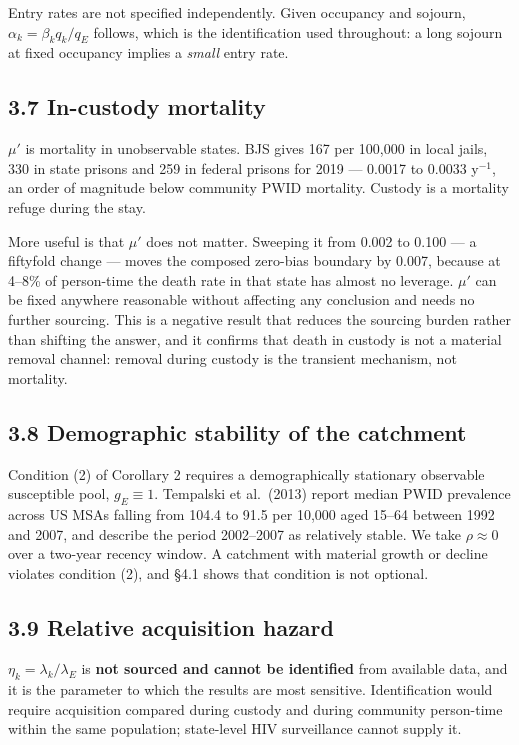 Entry rates are not specified independently. Given occupancy and sojourn, \(\alpha_k=\beta_kq_k/q_E\) follows, which is the identification used throughout: a long sojourn at fixed occupancy implies a \emph{small} entry rate.

\subsection{3.7 In-custody mortality}

\(\mu'\) is mortality in unobservable states. BJS gives 167 per 100,000 in local jails, 330 in state prisons and 259 in federal prisons for 2019 --- 0.0017 to 0.0033 y\(^{-1}\), an order of magnitude below community PWID mortality. Custody is a mortality refuge during the stay.

More useful is that \(\mu'\) does not matter. Sweeping it from 0.002 to 0.100 --- a fiftyfold change --- moves the composed zero-bias boundary by 0.007, because at 4--8\% of person-time the death rate in that state has almost no leverage. \(\mu'\) can be fixed anywhere reasonable without affecting any conclusion and needs no further sourcing. This is a negative result that reduces the sourcing burden rather than shifting the answer, and it confirms that death in custody is not a material removal channel: removal during custody is the transient mechanism, not mortality.

\subsection{3.8 Demographic stability of the catchment}

Condition (2) of Corollary 2 requires a demographically stationary observable susceptible pool, \(g_E\equiv1\). Tempalski et al.~(2013) report median PWID prevalence across US MSAs falling from 104.4 to 91.5 per 10,000 aged 15--64 between 1992 and 2007, and describe the period 2002--2007 as relatively stable. We take \(\rho\approx0\) over a two-year recency window. A catchment with material growth or decline violates condition (2), and §4.1 shows that condition is not optional.

\subsection{3.9 Relative acquisition hazard}

\(\eta_k=\lambda_k/\lambda_E\) is \textbf{not sourced and cannot be identified} from available data, and it is the parameter to which the results are most sensitive. Identification would require acquisition compared during custody and during community person-time within the same population; state-level HIV surveillance cannot supply it.

